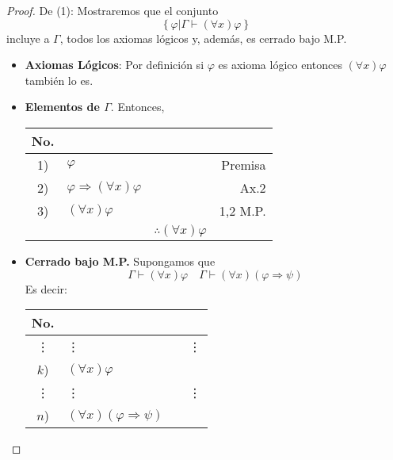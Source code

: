 \documentclass[12pt]{report}
\theoremstyle{largebreak}
\begin{document}
    \begin{proof}
        De (1): Mostraremos que el conjunto
        \begin{equation*}
            \left\{\varphi\Big|\Gamma\vdash(\forall x)\varphi \right\}
        \end{equation*}
        incluye a $\Gamma$, todos los axiomas lógicos y, además, es cerrado bajo M.P.
        \begin{itemize}
            \item \textbf{Axiomas Lógicos}: Por definición si $\varphi$ es axioma lógico entonces $(\forall x)\varphi$ también lo es.
            \item \textbf{Elementos de $\Gamma$}. Entonces,
            \begin{center}
                \begin{tabular}{ c  l  l  r  }
                    \hline
                    No. &  &  &  \\
                    \hline
                    1) & $\varphi$ &  & Premisa \\
                    2) & $\varphi\Rightarrow(\forall x)\varphi$ &  & Ax.2  \\
                    3) & $(\forall x)\varphi$ &  & 1,2 M.P.  \\
                    \hline
                      &  &  $\therefore(\forall x)\varphi$ &  \\
                \end{tabular}
            \end{center}
            \item \textbf{Cerrado bajo M.P.} Supongamos que
            \begin{equation*}
                \Gamma\vdash(\forall x)\varphi\quad\Gamma\vdash(\forall x)(\varphi\Rightarrow\psi)
            \end{equation*}
            Es decir:
            \begin{center}
                \begin{tabular}{ c  l  l  r  }
                    \hline
                    No. &  &  &  \\
                    \hline
                    \vdots & \vdots  &  & \vdots  \\
                    $k$) & $(\forall x)\varphi$ &  &   \\
                    \vdots & \vdots  &  & \vdots  \\
                    $n$) & $(\forall x)(\varphi\Rightarrow\psi)$ &  &   \\

\end{tabular}
\end{center}
\end{itemize}
\end{proof}
\end{document}
